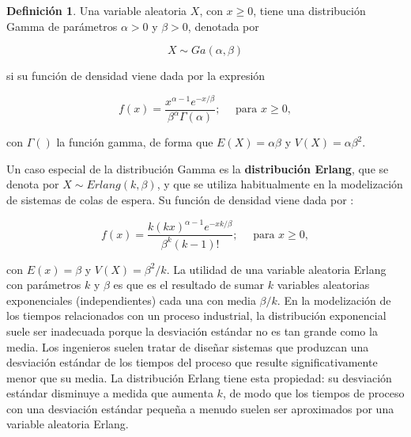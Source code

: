 \documentclass[
]{book}
\newenvironment{yellowbox}{
  \definecolor{shadecolor}{rgb}{210, 180, 140}  
  \color{black}
  \begin{shaded}}
 {\end{shaded}}
\theoremstyle{definition}
\newtheorem{definition}{Definición}[chapter]
\theoremstyle{definition}
\theoremstyle{definition}
\theoremstyle{definition}
\theoremstyle{remark}
\begin{document}
\begin{yellowbox}

\begin{definition}
\protect\hypertarget{def:vgamma}{}\label{def:vgamma}Una variable aleatoria \(X\), con \(x \geq 0\), tiene una distribución Gamma de parámetros \(\alpha > 0\) y \(\beta > 0\), denotada por

\[X \sim Ga(\alpha, \beta)\]

si su función de densidad viene dada por la expresión

\begin{equation}
f(x) = \frac{x^{\alpha -1} e^{-x/\beta}}{\beta^{\alpha} \Gamma(\alpha)}; \quad \text{ para } x \geq 0,
\label{eq:dgamma}
\end{equation}

con \(\Gamma()\) la función gamma, de forma que \(E(X) = \alpha\beta\) y \(V(X) = \alpha\beta^2.\)
\end{definition}

\end{yellowbox}

Un caso especial de la distribución Gamma es la \textbf{distribución Erlang}, que se denota por \(X \sim Erlang(k, \beta)\), y que se utiliza habitualmente en la modelización de sistemas de colas de espera. Su función de densidad viene dada por :

\begin{equation}
f(x) = \frac{k(kx)^{\alpha -1} e^{-xk/\beta}}{\beta^{k} (k-1)!}; \quad \text{ para } x \geq 0,
\label{eq:derlang}
\end{equation}

con \(E(x) = \beta\) y \(V(X) = \beta^2/k\). La utilidad de una variable aleatoria Erlang con parámetros \(k\) y \(\beta\) es que es el resultado de sumar \(k\) variables aleatorias exponenciales (independientes) cada una con media \(\beta/k\). En la modelización de los tiempos relacionados con un proceso industrial, la distribución exponencial suele ser inadecuada porque la desviación estándar no es tan grande como la media. Los ingenieros suelen tratar de diseñar sistemas que produzcan una desviación estándar de los tiempos del proceso que resulte significativamente menor que su media. La distribución Erlang tiene esta propiedad: su desviación estándar disminuye a medida que aumenta \(k\), de modo que los tiempos de proceso con una desviación estándar pequeña a menudo suelen ser aproximados por una variable aleatoria Erlang.
\end{document}
